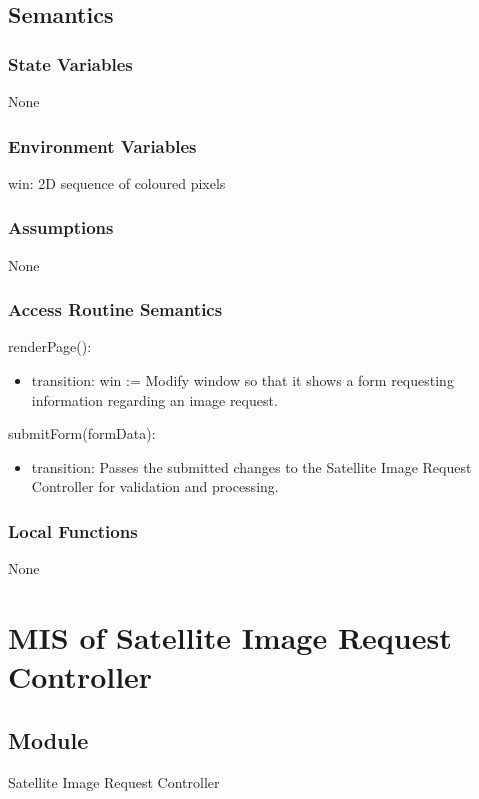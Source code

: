 \documentclass[12pt, titlepage]{article}
\begin{document}
\subsection{Semantics}

\subsubsection{State Variables}
None
\subsubsection{Environment Variables}
win: 2D sequence of coloured pixels

\subsubsection{Assumptions}
None

\subsubsection{Access Routine Semantics}

\noindent renderPage():
\begin{itemize}
\item transition: win := Modify window so that it shows a form requesting information regarding an image request.
\end{itemize}

\noindent submitForm(formData):
\begin{itemize}
\item transition: Passes the submitted changes to the Satellite Image Request Controller for validation and processing.
\end{itemize}

\subsubsection{Local Functions}
None

\section{MIS of Satellite Image Request Controller} \label{sirc}

\subsection{Module}

Satellite Image Request Controller
\end{document}
